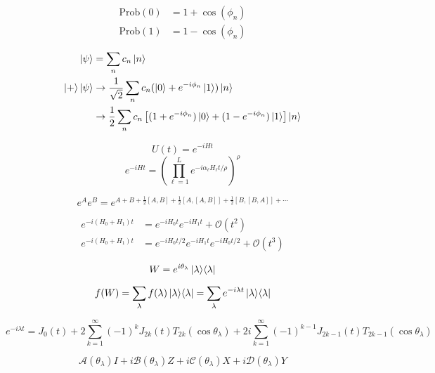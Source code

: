 \documentclass[11pt, oneside]{article}   	%
\begin{document}
\begin{align*} 
\textrm{Prob}(0) &= 1 + \cos(\phi_n) \\
\textrm{Prob}(1) &= 1 - \cos(\phi_n)
\end{align*}

\begin{align*} 
\ket{\psi} &= \sum_n c_n \ket{n} \\
\ket{+} \ket{\psi} 
& \rightarrow \frac{1}{\sqrt{2}} \sum_n c_n (\ket{0} + e^{-i \phi_n} \ket{1}) \ket{n} \\
& \rightarrow \frac{1}{2} \sum_n c_n \left[ (1+e^{-i \phi_n}) \ket{0} + (1-e^{-i \phi_n}) \ket{1} \right] \ket{n} 
\end{align*}


\begin{equation*}
U(t) = e^{-iHt}
\end{equation*}
\begin{equation*}
e^{-iHt} = \left( \prod^L_{\ell=1} e^{-i \alpha_{\ell} H_{\ell} t/\rho} \right)^{\rho}
\end{equation*}

\begin{equation*}
e^{A} e^{B} = e^{A + B + \frac{1}{2} [A, B] + \frac{1}{2} [A, [A, B]] + \frac{1}{2} [B, [B, A]] + \cdots}
\end{equation*}

\begin{align*}
e^{-i (H_0 + H_1) t} &= e^{-i H_0 t} e^{-i H_1 t} + \mathcal{O}(t^2) \\
e^{-i (H_0 + H_1) t} &= e^{-i H_0 t/2} e^{-i H_1 t} e^{-i H_0 t/2} + \mathcal{O}(t^3)
\end{align*}

\begin{equation*}
W = e^{i \theta_{\lambda}} \ket{\lambda} \! \bra{\lambda} 
\end{equation*}

\begin{equation*}
f(W) = \sum_{\lambda} f(\lambda) \ket{\lambda} \! \bra{\lambda} = \sum_{\lambda} e^{-i \lambda t} \ket{\lambda} \! \bra{\lambda}
\end{equation*}

\begin{equation*}
e^{-i \lambda t} = J_0(t) + 2 \sum^{\infty}_{k=1} (-1)^{k} J_{2k}(t) T_{2k}(\cos \theta_{\lambda}) + 2i \sum^{\infty}_{k=1} (-1)^{k-1} J_{2k-1}(t) T_{2k-1}(\cos \theta_{\lambda}) 
\end{equation*}

\begin{equation*}
\mathcal{A}(\theta_{\lambda}) I + i \mathcal{B}(\theta_{\lambda}) Z + i \mathcal{C}(\theta_{\lambda}) X + i \mathcal{D}(\theta_{\lambda}) Y
\end{equation*}
\end{document}
